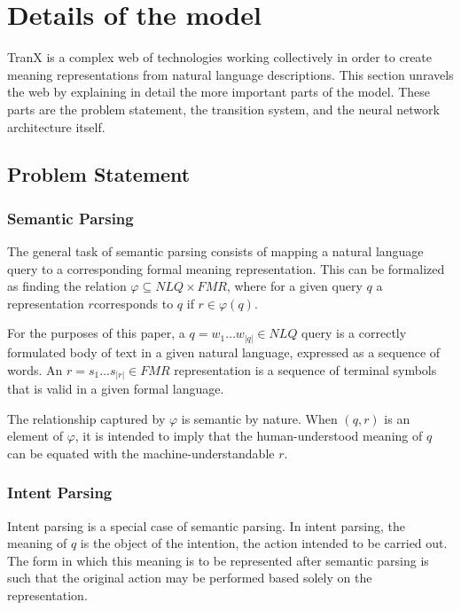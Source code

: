 \section{Details of the model}
TranX is a complex web of technologies working collectively in order to create meaning
representations from natural language descriptions. This section unravels the web by
explaining in detail the more important parts of the model. These parts are the problem
statement, the transition system, and the neural network architecture itself.

\subsection{Problem Statement}

\subsubsection{Semantic Parsing}\label{sec:parsing}

The general task of semantic parsing consists of mapping a natural language query to a
corresponding formal meaning representation. This can be formalized as finding the relation
\(\varphi \subseteq NLQ \times FMR\)\label{form:fmr}, where for a given query \(q\) a 
representation \(r\)corresponds to \(q\) if \(r \in \varphi(q)\).

For the purposes of this paper, a \(q = w_{1} \dots w_{|q|} \in NLQ\) query is a correctly
formulated body of text in a given natural language, expressed as a sequence of words.
An \(r = s_{1} ... s_{|r|} \in FMR\) representation is a sequence of terminal symbols
that is valid in a given formal language.

The relationship captured by \(\varphi\) is semantic by nature. When \((q, r)\) is an element of
\(\varphi\), it is intended to imply that the human-understood meaning of \(q\) can be equated
with the machine-understandable \(r\).

\subsubsection{Intent Parsing}

Intent parsing is a special case of semantic parsing. In intent parsing, the meaning of 
\(q\) is the object of the intention, the action intended to be carried out. The form in 
which this meaning is to be represented after semantic parsing is such that the original 
action may be performed based solely on the representation.

